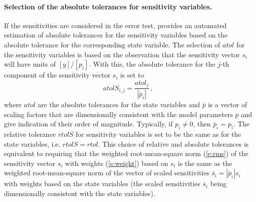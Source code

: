 \paragraph{Selection of the absolute tolerances for sensitivity variables.}
If the sensitivities are considered in the error test, {\cvodes} provides an 
automated estimation of absolute tolerances for the sensitivity variables 
based on the absolute tolerance for the corresponding state variable.
The selection of $atol$ for the sensitivity variables is based on the observation
that the sensitivity vector $s_i$ will have units of $[y]/[p_i]$.
With this, the absolute tolerance for the $j$-th component of the sensitivity
vector $s_i$ is set to
\begin{equation*}
atolS_{i,j} = \frac{atol_j}{|{\bar p}_i|} \, ,
\end{equation*}
where $atol$ are the absolute tolerances for the state variables and $\bar p$
is a vector of scaling factors that are dimensionally consistent with
the model parameters $p$ and give indication of their order of magnitude.
Typically, if $p_i \ne 0$, then ${\bar p}_i = p_i$. The relative tolerance
$rtolS$ for sensitivity variables is set to be the same as for the state variables,
i.e. $rtolS = rtol$. This choice of relative and absolute tolerances is equivalent 
to requiring that the weighted root-mean-square norm (\ref{e:rms}) of the sensitivity 
vector $s_i$ with weights (\ref{e:weight}) based on $s_i$ is the same as the
weighted root-mean-square norm of the vector of scaled sensitivities 
${\bar s}_i = |{\bar p}_i| s_i$ with weights based on the state variables
(the scaled sensitivities ${\bar s}_i$ being dimensionally consistent with the
state variables).

